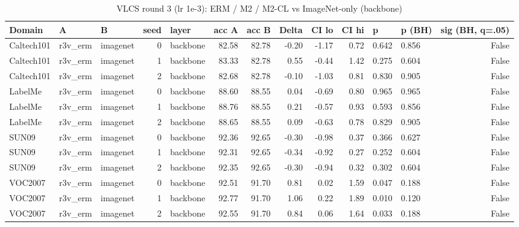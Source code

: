 \begin{table}
\caption{VLCS round 3 (lr 1e-3): ERM / M2 / M2-CL vs ImageNet-only (backbone)}
\label{tab:leak_r3v_vs_imagenet}
\begin{tabular}{lllrlrrrrrllr}
\toprule
Domain & A & B & seed & layer & acc A & acc B & Delta & CI lo & CI hi & p & p (BH) & sig (BH, q=.05) \\
\midrule
Caltech101 & r3v\_erm & imagenet & 0 & backbone & 82.58 & 82.78 & -0.20 & -1.17 & 0.72 & 0.642 & 0.856 & False \\
Caltech101 & r3v\_erm & imagenet & 1 & backbone & 83.33 & 82.78 & 0.55 & -0.44 & 1.42 & 0.275 & 0.604 & False \\
Caltech101 & r3v\_erm & imagenet & 2 & backbone & 82.68 & 82.78 & -0.10 & -1.03 & 0.81 & 0.830 & 0.905 & False \\
LabelMe & r3v\_erm & imagenet & 0 & backbone & 88.60 & 88.55 & 0.04 & -0.69 & 0.80 & 0.965 & 0.965 & False \\
LabelMe & r3v\_erm & imagenet & 1 & backbone & 88.76 & 88.55 & 0.21 & -0.57 & 0.93 & 0.593 & 0.856 & False \\
LabelMe & r3v\_erm & imagenet & 2 & backbone & 88.65 & 88.55 & 0.09 & -0.63 & 0.78 & 0.829 & 0.905 & False \\
SUN09 & r3v\_erm & imagenet & 0 & backbone & 92.36 & 92.65 & -0.30 & -0.98 & 0.37 & 0.366 & 0.627 & False \\
SUN09 & r3v\_erm & imagenet & 1 & backbone & 92.31 & 92.65 & -0.34 & -0.92 & 0.27 & 0.252 & 0.604 & False \\
SUN09 & r3v\_erm & imagenet & 2 & backbone & 92.35 & 92.65 & -0.30 & -0.94 & 0.32 & 0.302 & 0.604 & False \\
VOC2007 & r3v\_erm & imagenet & 0 & backbone & 92.51 & 91.70 & 0.81 & 0.02 & 1.59 & 0.047 & 0.188 & False \\
VOC2007 & r3v\_erm & imagenet & 1 & backbone & 92.77 & 91.70 & 1.06 & 0.22 & 1.89 & 0.010 & 0.120 & False \\
VOC2007 & r3v\_erm & imagenet & 2 & backbone & 92.55 & 91.70 & 0.84 & 0.06 & 1.64 & 0.033 & 0.188 & False \\
\bottomrule
\end{tabular}
\end{table}
